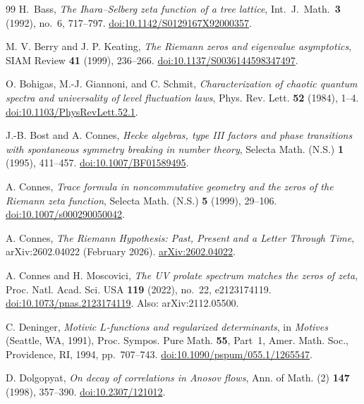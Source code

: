 \documentclass[12pt,a4paper]{article}
\theoremstyle{definition}
\theoremstyle{remark}
\begin{document}
\begingroup
\small
\begin{thebibliography}{99}
\setlength{\itemsep}{0.15em}
\setlength{\parsep}{0pt}
\setlength{\parskip}{0pt}
H.\ Bass,
\emph{The Ihara--Selberg zeta function of a tree lattice},
Int.\ J.\ Math.\ \textbf{3} (1992), no.~6, 717--797.
\href{https://doi.org/10.1142/S0129167X92000357}{doi:10.1142/S0129167X92000357}.

M. V. Berry and J. P. Keating,
\emph{The Riemann zeros and eigenvalue asymptotics},
SIAM Review \textbf{41} (1999), 236--266.
\href{https://doi.org/10.1137/S0036144598347497}{doi:10.1137/S0036144598347497}.

O. Bohigas, M.-J. Giannoni, and C. Schmit,
\emph{Characterization of chaotic quantum spectra and universality of level fluctuation laws},
Phys. Rev. Lett. \textbf{52} (1984), 1--4.
\href{https://doi.org/10.1103/PhysRevLett.52.1}{doi:10.1103/PhysRevLett.52.1}.

J.-B. Bost and A. Connes,
\emph{Hecke algebras, type III factors and phase transitions with spontaneous symmetry breaking in number theory},
Selecta Math. (N.S.) \textbf{1} (1995), 411--457.
\href{https://doi.org/10.1007/BF01589495}{doi:10.1007/BF01589495}.

A. Connes,
\emph{Trace formula in noncommutative geometry and the zeros of the Riemann zeta function},
Selecta Math. (N.S.) \textbf{5} (1999), 29--106.
\href{https://doi.org/10.1007/s000290050042}{doi:10.1007/s000290050042}.

A. Connes,
\emph{The Riemann Hypothesis: Past, Present and a Letter Through Time},
arXiv:2602.04022 (February 2026).
\href{https://arxiv.org/abs/2602.04022}{arXiv:2602.04022}.

A. Connes and H. Moscovici,
\emph{The UV prolate spectrum matches the zeros of zeta},
Proc. Natl. Acad. Sci. USA \textbf{119} (2022), no.~22, e2123174119.
\href{https://doi.org/10.1073/pnas.2123174119}{doi:10.1073/pnas.2123174119}.
Also: arXiv:2112.05500.

C. Deninger,
\emph{Motivic $L$-functions and regularized determinants},
in \emph{Motives} (Seattle, WA, 1991),
Proc. Sympos. Pure Math. \textbf{55}, Part~1, Amer. Math. Soc., Providence, RI, 1994, pp.~707--743.
\href{https://doi.org/10.1090/pspum/055.1/1265547}{doi:10.1090/pspum/055.1/1265547}.

D. Dolgopyat,
\emph{On decay of correlations in Anosov flows},
Ann. of Math. (2) \textbf{147} (1998), 357--390.
\href{https://doi.org/10.2307/121012}{doi:10.2307/121012}.


\end{thebibliography}
\end{document}
